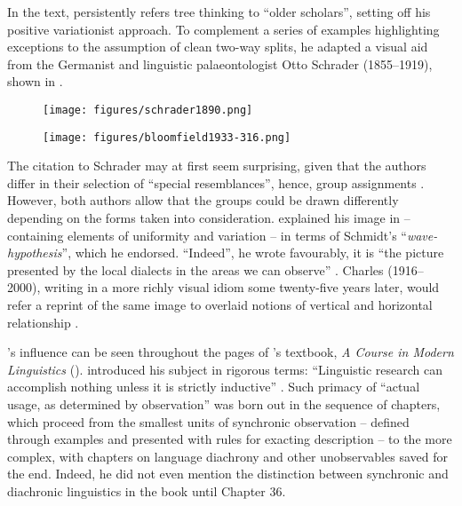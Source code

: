 \documentclass[output=paper]{langscibook}
\begin{document}
In the text, {\Bloomfield} persistently refers tree thinking to ``older scholars'', setting off his positive variationist approach. To complement a series of examples highlighting exceptions to the assumption of clean two-way splits, he adapted a visual aid from the Germanist and linguistic palaeontologist Otto Schrader (1855--1919), shown in .

\begin{figure}
    \centering
    \texttt{[image: figures/schrader1890.png]}
    \caption{\citet[65]{Schrader1890}}
    \label{fig:kaplan:schrader}
\end{figure}

\begin{figure}
    \centering
    \texttt{[image: figures/bloomfield1933-316.png]}
    \caption{\citet[316]{Bloomfield1933}}
    \label{fig:kaplan:bloomfield316}
\end{figure}

The citation to Schrader may at first seem surprising, given that the authors differ in their selection of ``special resemblances'', hence, group assignments \citep[317]{Bloomfield1933}. However, both authors allow that the groups could be drawn differently depending on the forms taken into consideration. {\Bloomfield} explained his image in  -- containing elements of uniformity and variation -- in terms of Schmidt's ``\emph{wave-hypothesis}'', which he endorsed. ``Indeed'', he wrote favourably, it is ``the picture presented by the local dialects in the areas we can observe'' \citep[317]{Bloomfield1933}. Charles {\Hockett} (1916--2000), writing in a more richly visual idiom some twenty-five years later, would refer a reprint of the same image to overlaid notions of vertical and horizontal relationship \citep[cf.][]{Huebschmann1875}.

{\Bloomfield}'s influence can be seen throughout the pages of {\Hockett}'s textbook, \emph{A Course in Modern Linguistics} (\citeyear{Hockett19591958}). {\Hockett} introduced his subject in rigorous terms: ``Linguistic research can accomplish nothing unless it is strictly inductive'' \citep[7]{Hockett19591958}. Such primacy of ``actual usage, as determined by observation'' was born out in the sequence of chapters, which proceed from the smallest units of synchronic observation -- defined through examples and presented with rules for exacting description -- to the more complex, with chapters on language diachrony and other unobservables saved for the end. Indeed, he did not even mention the distinction between synchronic and diachronic linguistics in the book until Chapter 36.
\end{document}
